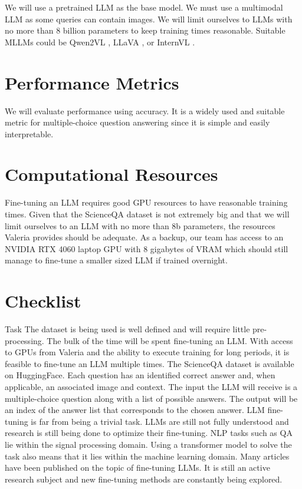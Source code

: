 \documentclass[11pt]{article} %
\begin{document}
We will use a pretrained LLM as the base model. We must use a multimodal LLM as some queries can contain images. We will limit ourselves to LLMs with no more than 8 billion parameters to keep training times reasonable. Suitable MLLMs could be Qwen2VL \cite{Qwen2VL}, LLaVA \cite{liu2023llava}, or InternVL \cite{chen2023internvl}. 

\section*{Performance Metrics}
We will evaluate performance using accuracy. It is a widely used and suitable metric for multiple-choice question answering since it is simple and easily interpretable.

\section*{Computational Resources}
Fine-tuning an LLM requires good GPU resources to have reasonable training times. Given that the ScienceQA dataset is not extremely big and that we will limit ourselves to an LLM with no more than 8b parameters, the resources Valeria provides should be adequate. As a backup, our team has access to an NVIDIA RTX 4060 laptop GPU with 8 gigabytes of VRAM which should still manage to fine-tune a smaller sized LLM if trained overnight. 

\section*{Checklist}
\begin{CheckList}{Task}
     The dataset is being used is well defined and will require little pre-processing. The bulk of the time will be spent fine-tuning an LLM. With access to GPUs from Valeria and the ability to execute training for long periods, it is feasible to fine-tune an LLM multiple times.
     The ScienceQA dataset is available on HuggingFace. Each question has an identified correct answer and, when applicable, an associated image and context.
     The input the LLM will receive is a multiple-choice question along with a list of possible answers. The output will be an index of the answer list that corresponds to the chosen answer.
     LLM fine-tuning is far from being a trivial task. LLMs are still not fully understood and research is still being done to optimize their fine-tuning. 
     NLP tasks such as QA lie within the signal processing domain. Using a transformer model to solve the task also means that it lies within the machine learning domain.
     Many articles have been published on the topic of fine-tuning LLMs. It is still an active research subject and new fine-tuning methods are constantly being explored.
\end{CheckList}
\end{document}
